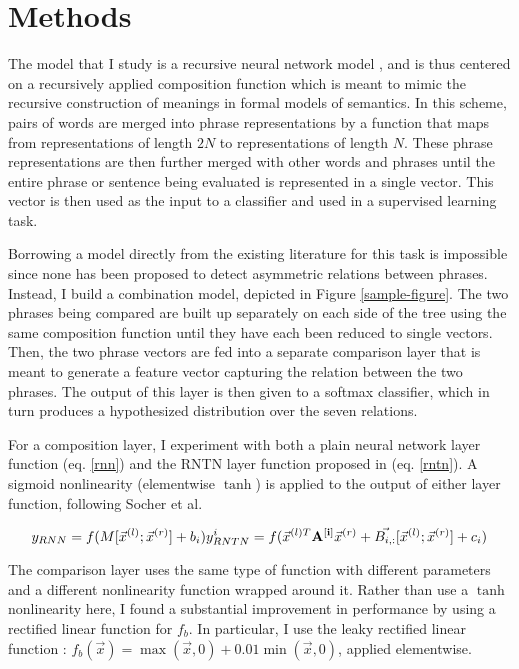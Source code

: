 \section{Methods}

The model that I study is a recursive neural network model \citet{socher2011dynamic}, and is thus centered on a recursively applied composition function which is meant to mimic the recursive construction of meanings in formal models of semantics. In this scheme, pairs of words are merged into phrase representations by a function that maps from representations of length $2N$ to representations of length $N$. These phrase representations are then further merged with other words and phrases until the entire phrase or sentence being evaluated is represented in a single vector. This vector is then used as the input to a classifier and used in a supervised learning task.

Borrowing a model directly from the existing literature for this task is impossible since none has been proposed to detect asymmetric relations between phrases. Instead, I build a combination model, depicted in Figure \ref{sample-figure}. The two phrases being compared are built up separately on each side of the tree using the same composition function until they have each been reduced to single vectors. Then, the two phrase vectors are fed into a separate comparison layer that is meant to generate a feature vector capturing the relation between the two phrases. The output of this layer is then given to a softmax classifier, which in turn produces a hypothesized distribution over the seven relations.

For a composition layer, I experiment with both a plain neural network layer function (eq. \ref{rnn}) and the RNTN layer function proposed in \citet{chen2013learning} (eq. \ref{rntn}). A sigmoid nonlinearity (elementwise $\tanh$) is applied to the output of either layer function, following Socher et al.

 \label{rnn}\label{rntn} %
\begin{equation}
y_{RNN} = f(M [\vec{x}^{(l)}; \vec{x}^{(r)}] + b_i)\\
y_{RNTN}^i = f(\vec{x}^{(l)T} \mathbf{A^{[i]}} \vec{x}^{(r)} + \vec{B_{i,:}} [\vec{x}^{(l)}; \vec{x}^{(r)}] + c_i)
\end{equation}

The comparison layer uses the same type of function with different parameters and a different nonlinearity function wrapped around it. Rather than use a $\tanh$ nonlinearity here, I found a substantial improvement in performance by using a rectified linear function for $f_{b}$. In particular, I use the leaky rectified linear function \cite{maasrectifier}: $f_{b}(\vec{x})=\max(\vec{x}, 0) + 0.01\min(\vec{x}, 0)$,  applied elementwise. 


